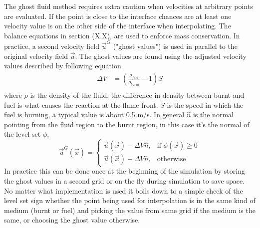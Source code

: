 The ghost fluid method requires extra caution when velocities at arbitrary points are evaluated. If the point is close to the interface chances are at least one velocity value is on the other side of the interface when interpolating. The balance equations in section (X.X), are used to enforce mass conservation. In practice, a second velocity field \begin{math}\vec{u}^{ G}\end{math} ("ghost values") is used in parallel to the original velocity field \begin{math}\vec{u}\end{math}. The ghost values are found using the adjusted velocity values described by following equation
\begin{align}
\Delta V  & = (\frac{\rho_{fuel}}{\rho_{burnt}} - 1)S \\
\end{align}
where $\rho $ is the density of the fluid, the difference in density between burnt and fuel is what causes the reaction at the flame front. $S$ is the speed in which the fuel is burning, a typical value is about 0.5 m/s. In general $ \hat n$ is the normal pointing from the fluid region to the burnt region, in this case it's the normal of the level-set $ \phi $.
\begin{equation}
    \vec{u}^{G}(\vec{x})= 
\begin{cases}
    \vec{u}(\vec{x})-\Delta V \hat{n},& \text{if } \phi (\vec{x}) \geq 0\\
    \vec{u}(\vec{x})+\Delta V \hat{n},                    & \text{otherwise}
\end{cases}
\end{equation}
In practice this can be done once at the beginning of the simulation by storing the ghost values in a second grid or on the fly during simulation to save space. No matter what implementation is used it boils down to a simple check of the level set sign whether the point being used for interpolation is in the same kind of medium (burnt or fuel) and picking the value from same grid if the medium is the same, or choosing the ghost value otherwise. 
